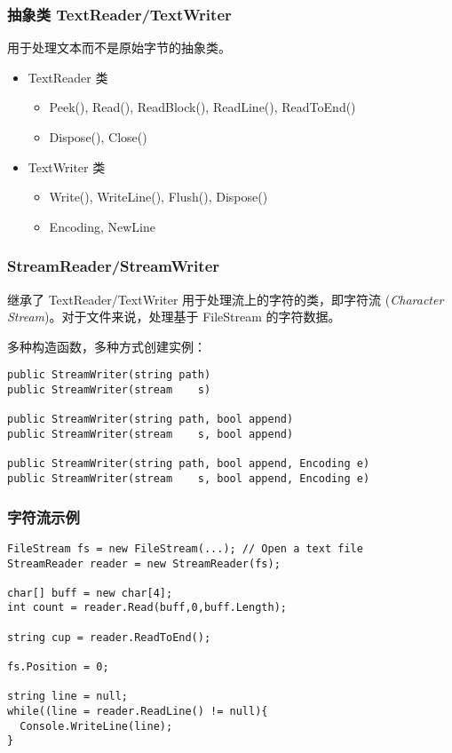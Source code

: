\begin{frame}
\frametitle{抽象类 TextReader/TextWriter}
\CJKindent 用于处理文本而不是原始字节的抽象类。
\medskip
\begin{itemize}
\setlength{\itemsep}{6pt plus 1pt}
\item TextReader 类
\begin{itemize}
\setlength{\itemsep}{4pt plus 1pt}
\item Peek(), Read(), ReadBlock(), ReadLine(), ReadToEnd()
\item Dispose(), Close()
\end{itemize}
\item TextWriter 类
\begin{itemize}
\setlength{\itemsep}{4pt plus 1pt}
\item Write(), WriteLine(), Flush(), Dispose()
\item Encoding, NewLine
\end{itemize}
\end{itemize}
\end{frame}

\begin{frame}[fragile]
\frametitle{StreamReader/StreamWriter}
\CJKindent 继承了 TextReader/TextWriter 用于处理流上的字符的类，即字符流
(\textit{Character Stream})。对于文件来说，处理基于 FileStream 的字符数据。
\medskip

多种构造函数，多种方式创建实例：
\begin{lstlisting}
public StreamWriter(string path)
public StreamWriter(stream    s)

public StreamWriter(string path, bool append)
public StreamWriter(stream    s, bool append)

public StreamWriter(string path, bool append, Encoding e)
public StreamWriter(stream    s, bool append, Encoding e)
\end{lstlisting}
\end{frame}

\begin{frame}[fragile]
\frametitle{字符流示例}
\begin{lstlisting}
FileStream fs = new FileStream(...); // Open a text file
StreamReader reader = new StreamReader(fs);

char[] buff = new char[4];
int count = reader.Read(buff,0,buff.Length);

string cup = reader.ReadToEnd();

fs.Position = 0;

string line = null;
while((line = reader.ReadLine() != null){
  Console.WriteLine(line);
}
\end{lstlisting}
\end{frame}

